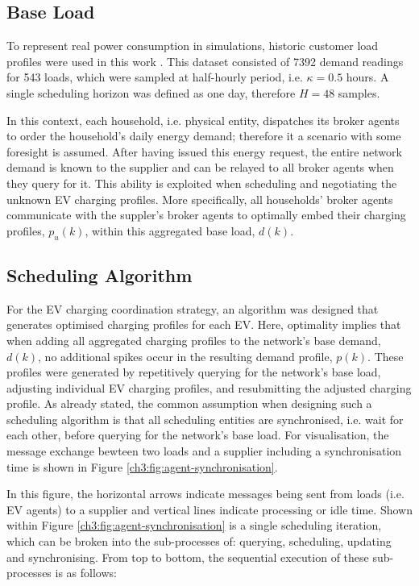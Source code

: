 \subsection{Base Load}

To represent real power consumption in simulations, historic customer load profiles were used in this work \cite{IrishData2002}.
This dataset consisted of 7392 demand readings for 543 loads, which were sampled at half-hourly period, i.e. $\kappa = 0.5$ hours.
A single scheduling horizon was defined as one day, therefore $H=48$ samples.

In this context, each household, i.e. physical entity, dispatches its broker agents to order the household's daily energy demand; therefore it a scenario with some foresight is assumed.
After having issued this energy request, the entire network demand is known to the supplier and can be relayed to all broker agents when they query for it.
This ability is exploited when scheduling and negotiating the unknown EV charging profiles.
More specifically, all households' broker agents communicate with the suppler's broker agents to optimally embed their charging profiles, $p_u(k)$, within this aggregated base load, $d(k)$.

\subsection{Scheduling Algorithm}

For the EV charging coordination strategy, an algorithm was designed that generates optimised charging profiles for each EV.
Here, optimality implies that when adding all aggregated charging profiles to the network's base demand, $d(k)$, no additional spikes occur in the resulting demand profile, $p(k)$.
These profiles were generated by repetitively querying for the network's base load, adjusting individual EV charging profiles, and resubmitting the adjusted charging profile.
As already stated, the common assumption when designing such a scheduling algorithm is that all scheduling entities are synchronised, i.e. wait for each other, before querying for the network's base load.
For visualisation, the message exchange bewteen two loads and a supplier including a synchronisation time is shown in Figure \ref{ch3:fig:agent-synchronisation}.



In this figure, the horizontal arrows indicate messages being sent from loads (i.e. EV agents) to a supplier and vertical lines indicate processing or idle time.
Shown within Figure \ref{ch3:fig:agent-synchronisation} is a single scheduling iteration, which can be broken into the sub-processes of: querying, scheduling, updating and synchronising.
From top to bottom, the sequential execution of these sub-processes is as follows:

